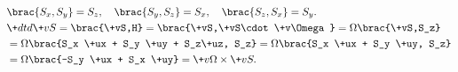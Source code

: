 \documentclass[hidelinks]{ctexart}
\begin{document}
\begin{align*}
    & \brac{S_x,S_y} = S_z,\quad \brac{S_y,S_z} = S_x,\quad \brac{S_z,S_x} = S_y. \\
    & \+dtd{\+vS} = \brac{\+vS,H} = \brac{\+vS,\+vS\cdot \+v\Omega} = \Omega\brac{\+vS,S_z} \\
    & = \Omega\brac{S_x \+ux + S_y \+uy + S_z\+uz, S_z} = \Omega\brac{S_x \+ux + S_y \+uy, S_z} \\
    & = \Omega\brac{-S_y \+ux + S_x \+uy} = \+v\Omega\times \+vS.
\end{align*}
\end{document}
